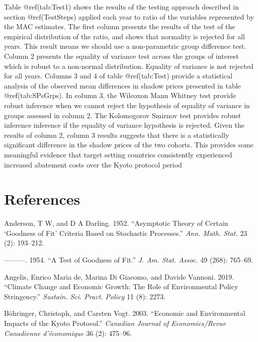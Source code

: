 \documentclass[
  10pt,
]{article}
\begin{document}
Table @ref(tab:Test1) shows the results of the testing approach
described in section @ref(TestSteps) applied each year to ratio of the
variables represented by the MAC estimates. The first column presents
the results of the test of the empirical distribution of the ratio, and
shows that normality is rejected for all years. This result means we
should use a non-parametric group difference test. Column 2 presents the
equality of variance test across the groups of interest which is robust
to a non-normal distribution. Equality of variance is not rejected for
all years. Columns 3 and 4 of table @ref(tab:Test) provide a statistical
analysis of the observed mean differences in shadow prices presented in
table @ref(tab:SPsGrps). In column 3, the Wilcoxon Mann Whitney test
provide robust inference when we cannot reject the hypothesis of
equality of variance in groups assessed in column 2. The Kolomogorov
Smirnov test provides robust inference inference if the equality of
variance hypothesis is rejected. Given the results of column 2, column 3
results suggests that there is a statistically significant difference in
the shadow prices of the two cohorts. This provides some meaningful
evidence that target setting countries consistently experienced
increased abatement costs over the Kyoto protocol period

\hypertarget{references}{%
\section*{References}\label{references}}

\hypertarget{refs}{}
\leavevmode\hypertarget{ref-Anderson1952}{}%
Anderson, T W, and D A Darling. 1952. ``Asymptotic Theory of Certain
`Goodness of Fit' Criteria Based on Stochastic Processes.'' \emph{Ann.
Math. Stat.} 23 (2): 193--212.

\leavevmode\hypertarget{ref-Anderson1954}{}%
---------. 1954. ``A Test of Goodness of Fit.'' \emph{J. Am. Stat.
Assoc.} 49 (268): 765--69.

\leavevmode\hypertarget{ref-De_Angelis2019}{}%
Angelis, Enrico Maria de, Marina Di Giacomo, and Davide Vannoni. 2019.
``Climate Change and Economic Growth: The Role of Environmental Policy
Stringency.'' \emph{Sustain. Sci. Pract. Policy} 11 (8): 2273.

\leavevmode\hypertarget{ref-Bohringer2003}{}%
Böhringer, Christoph, and Carsten Vogt. 2003. ``Economic and
Environmental Impacts of the Kyoto Protocol.'' \emph{Canadian Journal of
Economics/Revue Canadienne d'économique} 36 (2): 475--96.
\end{document}
